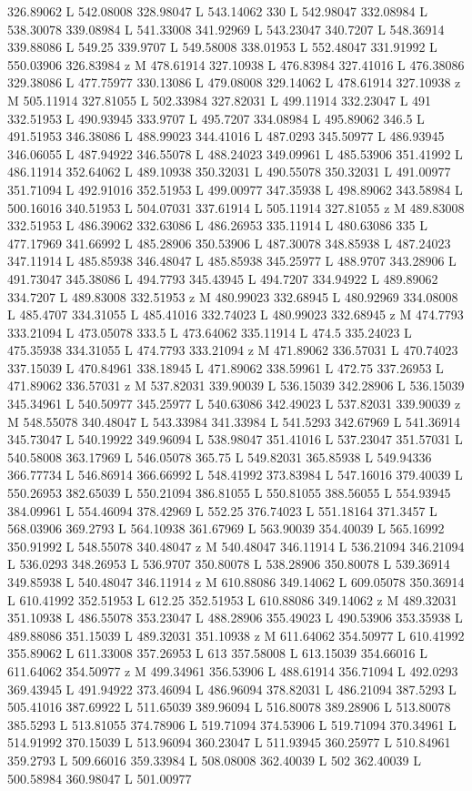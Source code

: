 {\begin{scope}[local bounding box=bb]
{326.89062 L 542.08008 328.98047 L 543.14062 330 L 542.98047 332.08984 L 538.30078 339.08984 L 541.33008 341.92969 L 543.23047 340.7207 L 548.36914 339.88086 L 549.25 339.9707 L 549.58008 338.01953 L 552.48047 331.91992 L 550.03906 326.83984 z M 478.61914 327.10938 L 476.83984 327.41016 L 476.38086 329.38086 L 477.75977 330.13086 L 479.08008 329.14062 L 478.61914 327.10938 z M 505.11914 327.81055 L 502.33984 327.82031 L 499.11914 332.23047 L 491 332.51953 L 490.93945 333.9707 L 495.7207 334.08984 L 495.89062 346.5 L 491.51953 346.38086 L 488.99023 344.41016 L 487.0293 345.50977 L 486.93945 346.06055 L 487.94922 346.55078 L 488.24023 349.09961 L 485.53906 351.41992 L 486.11914 352.64062 L 489.10938 350.32031 L 490.55078 350.32031 L 491.00977 351.71094 L 492.91016 352.51953 L 499.00977 347.35938 L 498.89062 343.58984 L 500.16016 340.51953 L 504.07031 337.61914 L 505.11914 327.81055 z M 489.83008 332.51953 L 486.39062 332.63086 L 486.26953 335.11914 L 480.63086 335 L 477.17969 341.66992 L 485.28906 350.53906 L 487.30078 348.85938 L 487.24023 347.11914 L 485.85938 346.48047 L 485.85938 345.25977 L 488.9707 343.28906 L 491.73047 345.38086 L 494.7793 345.43945 L 494.7207 334.94922 L 489.89062 334.7207 L 489.83008 332.51953 z M 480.99023 332.68945 L 480.92969 334.08008 L 485.4707 334.31055 L 485.41016 332.74023 L 480.99023 332.68945 z M 474.7793 333.21094 L 473.05078 333.5 L 473.64062 335.11914 L 474.5 335.24023 L 475.35938 334.31055 L 474.7793 333.21094 z M 471.89062 336.57031 L 470.74023 337.15039 L 470.84961 338.18945 L 471.89062 338.59961 L 472.75 337.26953 L 471.89062 336.57031 z M 537.82031 339.90039 L 536.15039 342.28906 L 536.15039 345.34961 L 540.50977 345.25977 L 540.63086 342.49023 L 537.82031 339.90039 z M 548.55078 340.48047 L 543.33984 341.33984 L 541.5293 342.67969 L 541.36914 345.73047 L 540.19922 349.96094 L 538.98047 351.41016 L 537.23047 351.57031 L 540.58008 363.17969 L 546.05078 365.75 L 549.82031 365.85938 L 549.94336 366.77734 L 546.86914 366.66992 L 548.41992 373.83984 L 547.16016 379.40039 L 550.26953 382.65039 L 550.21094 386.81055 L 550.81055 388.56055 L 554.93945 384.09961 L 554.46094 378.42969 L 552.25 376.74023 L 551.18164 371.3457 L 568.03906 369.2793 L 564.10938 361.67969 L 563.90039 354.40039 L 565.16992 350.91992 L 548.55078 340.48047 z M 540.48047 346.11914 L 536.21094 346.21094 L 536.0293 348.26953 L 536.9707 350.80078 L 538.28906 350.80078 L 539.36914 349.85938 L 540.48047 346.11914 z M 610.88086 349.14062 L 609.05078 350.36914 L 610.41992 352.51953 L 612.25 352.51953 L 610.88086 349.14062 z M 489.32031 351.10938 L 486.55078 353.23047 L 488.28906 355.49023 L 490.53906 353.35938 L 489.88086 351.15039 L 489.32031 351.10938 z M 611.64062 354.50977 L 610.41992 355.89062 L 611.33008 357.26953 L 613 357.58008 L 613.15039 354.66016 L 611.64062 354.50977 z M 499.34961 356.53906 L 488.61914 356.71094 L 492.0293 369.43945 L 491.94922 373.46094 L 486.96094 378.82031 L 486.21094 387.5293 L 505.41016 387.69922 L 511.65039 389.96094 L 516.80078 389.28906 L 513.80078 385.5293 L 513.81055 374.78906 L 519.71094 374.53906 L 519.71094 370.34961 L 514.91992 370.15039 L 513.96094 360.23047 L 511.93945 360.25977 L 510.84961 359.2793 L 509.66016 359.33984 L 508.08008 362.40039 L 502 362.40039 L 500.58984 360.98047 L 501.00977 }
\end{scope}}
